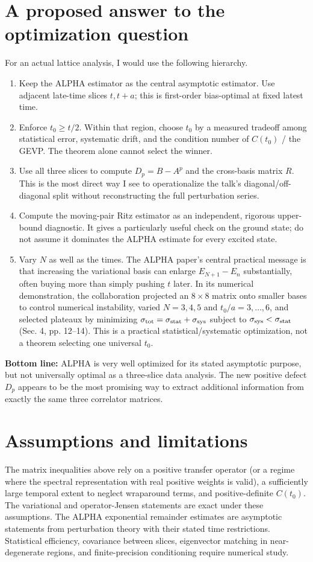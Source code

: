 \documentclass[11pt]{article}
\begin{document}
\section{A proposed answer to the optimization question}
For an actual lattice analysis, I would use the following hierarchy.
\begin{enumerate}
\item Keep the ALPHA estimator as the central asymptotic estimator. Use adjacent late-time slices $t,t+a$; this is first-order bias-optimal at fixed latest time.
\item Enforce $t_0\geq t/2$. Within that region, choose $t_0$ by a measured tradeoff among statistical error, systematic drift, and the condition number of $C(t_0)$ / the GEVP. The theorem alone cannot select the winner.
\item Use all three slices to compute $D_p=B-A^p$ and the cross-basis matrix $R$. This is the most direct way I see to operationalize the talk's diagonal/off-diagonal split without reconstructing the full perturbation series.
\item Compute the moving-pair Ritz estimator as an independent, rigorous upper-bound diagnostic. It gives a particularly useful check on the ground state; do not assume it dominates the ALPHA estimate for every excited state.
\item Vary $N$ as well as the times. The ALPHA paper's central practical message is that increasing the variational basis can enlarge $E_{N+1}-E_n$ substantially, often buying more than simply pushing $t$ later. In its numerical demonstration, the collaboration projected an $8\times8$ matrix onto smaller bases to control numerical instability, varied $N=3,4,5$ and $t_0/a=3,\ldots,6$, and selected plateaux by minimizing $\sigma_{\rm tot}=\sigma_{\rm stat}+\sigma_{\rm sys}$ subject to $\sigma_{\rm sys}<\sigma_{\rm stat}$ (Sec. 4, pp. 12--14). This is a practical statistical/systematic optimization, not a theorem selecting one universal $t_0$.
\end{enumerate}

\textbf{Bottom line:} ALPHA is very well optimized for its stated asymptotic purpose, but not universally optimal as a three-slice data analysis. The new positive defect $D_p$ appears to be the most promising way to extract additional information from exactly the same three correlator matrices.

\section*{Assumptions and limitations}
The matrix inequalities above rely on a positive transfer operator (or a regime where the spectral representation with real positive weights is valid), a sufficiently large temporal extent to neglect wraparound terms, and positive-definite $C(t_0)$. The variational and operator-Jensen statements are exact under these assumptions. The ALPHA exponential remainder estimates are asymptotic statements from perturbation theory with their stated time restrictions. Statistical efficiency, covariance between slices, eigenvector matching in near-degenerate regions, and finite-precision conditioning require numerical study.
\end{document}
